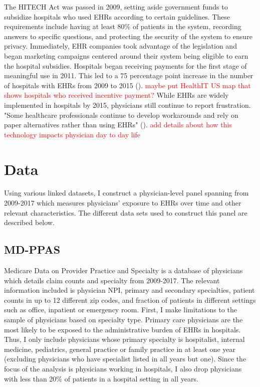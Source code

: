 \documentclass[11pt]{article}
\begin{document}
The HITECH Act was passed in 2009, setting aside government funds to subsidize hospitals who used EHRs according to certain guidelines. These requirements include having at least 80\% of patients in the system, recording answers to specific questions, and protecting the security of the system to ensure privacy. Immediately, EHR companies took advantage of the legislation and began marketing campaigns centered around their system being eligible to earn the hospital subsidies. Hospitals began receiving payments for the first stage of meaningful use in 2011. This led to a 75 percentage point increase in the number of hospitals with EHRs from 2009 to 2015 (\cite{stats}). \textcolor{red}{maybe put HealthIT US map that shows hospitals who received incentive payment?} While EHRs are widely implemented in hospitals by 2015, physicians still continue to report frustration. "Some healthcare professionals continue to develop workarounds and rely on paper alternatives rather than using EHRs" (\cite{evans2016electronic}).  
\textcolor{red}{add details about how this technology impacts physician day to day life}

\section{Data}

Using various linked datasets, I construct a physician-level panel spanning from 2009-2017 which measures physicians' exposure to EHRs over time and other relevant characteristics. The different data sets used to construct this panel are described below.

\subsection{MD-PPAS}

Medicare Data on Provider Practice and Specialty is a database of physicians which details claim counts and specialty from 2009-2017. The relevant information included is physician NPI, primary and secondary specialties, patient counts in up to 12 different zip codes, and fraction of patients in different settings such as office, inpatient or emergency room. First, I make limitations to the sample of physicians based on specialty type. Primary care physicians are the most likely to be exposed to the administrative burden of EHRs in hospitals. Thus, I only include physicians whose primary specialty is hospitalist, internal medicine, pediatrics, general practice or family practice in at least one year (excluding physicians who have specialist listed in all years but one). Since the focus of the analysis is physicians working in hospitals, I also drop physicians with less than 20\% of patients in a hospital setting in all years.
\end{document}
